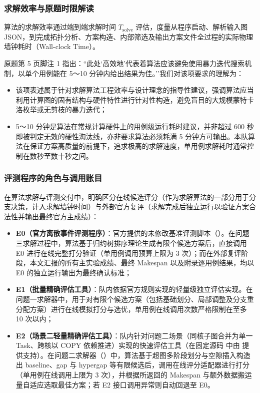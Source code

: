 \documentclass[anonymous,notoc]{gmcm2026}
\providecommand{\tightlist}{\setlength{\itemsep}{0pt}\setlength{\parskip}{0pt}}
\begin{document}
\subsubsection{求解效率与原题时限解读}

算法的求解效率通过端到端求解时间 \(T_{\text{solve}}\) 评估，度量从程序启动、解析输入图 JSON，到完成拓扑分析、方案构造、内部筛选及输出方案文件全过程的实际物理墙钟耗时（Wall-clock Time）。

原题第 5 页脚注 1 指出：``此处`高效地'代表着算法应该避免使用暴力迭代搜索机制，以单个用例能在 5～10 分钟内给出结果为佳。''我们对该项要求的理解为：

\begin{itemize}
\tightlist
\item
  该项表述属于针对求解算法工程效率与设计理念的指导性建议，强调算法应当利用计算图的固有结构与硬件特性进行针对性构造，避免盲目的大规模蒙特卡洛枚举或无剪枝的暴力迭代；
\item
  5～10 分钟是算法在常规计算硬件上的用例级运行耗时建议，并非超过 600 秒即被判定无效的硬性淘汰线，亦非要求算法必须耗满 5 分钟方可输出。本队算法在保证方案高质量的前提下，追求极高的求解速度，单用例求解耗时通常控制在数秒至数十秒之间。
\end{itemize}

\subsubsection{评测程序的角色与调用账目}

在算法求解与评测交付中，明确区分在线候选评分（作为求解算法的一部分用于分支决策，计入求解墙钟时间）与外部官方复评（求解完成后独立运行以验证方案合法性并输出最终官方主成绩）：

\begin{itemize}
\tightlist
\item
  \textbf{E0（官方离散事件评测程序）}：官方提供的未修改基准评测脚本（\texttt{}）。在问题三求解过程中，算法基于归约树排序理论生成有限个候选方案后，直接调用 E0 进行在线完整打分验证（单用例调用预算上限为 3 次）；而在外部复评阶段，本文汇报的所有主实验成绩、最终 Makespan 以及附录逐用例结果，均以 E0 的独立运行输出为最终确认标准；
\item
  \textbf{E1（批量精确评估工具）}：队内依据官方规则实现的轻量级独立评估实现。在问题一求解器中，用于对有限个候选方案（包括基础划分、局部调整及分支重分配方案）进行在线模拟打分与选优，单用例在线调用次数严格限制在至多 10 次以内；
\item
  \textbf{E2（场景二轻量精确评估工具）}：队内针对问题二场景（同核子图合并为单一 Task、跨核以 COPY 依赖推进）实现的快速评估工具（在固定源码 \texttt{} 中由 \texttt{} 提供支持）。在问题二求解器（\texttt{}）中，算法基于超图多阶段划分与空隙插入构造出 baseline、gap 与 hypergap 等有限候选后，调用在线评分适配器进行打分（单用例在线调用上限为 3 次），并根据所返回的 Makespan 与额外数据搬运量自适应选取最佳方案；若 E2 接口调用异常则自动回退至 E0。
\end{itemize}
\end{document}
